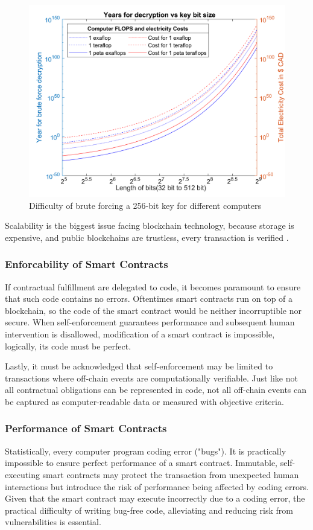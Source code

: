  	\begin{figure}[ht]
  	\centering 
  	\includegraphics[width=0.7\linewidth]{Diagrams/epicPic.png}
  	\caption{Difficulty of brute forcing a 256-bit key for different computers}
  	\label{security:fig2}
  	\end{figure}


Scalability is the biggest issue facing blockchain technology, because storage is expensive, and public blockchains are trustless, every transaction is verified \cite{ethScale:Online}. 

\subsubsection{Enforcability of Smart Contracts}



If contractual fulfillment are delegated to code, it becomes paramount to
ensure that such code contains no errors.  Oftentimes smart contracts run on top of a blockchain, so the code of the smart contract would be neither incorruptible nor secure. When self-enforcement guarantees performance and subsequent human intervention is disallowed, modification of a  smart contract is impossible, logically, its
code must be perfect. 

Lastly, it must be acknowledged that self-enforcement may be limited to transactions
where off-chain events are computationally verifiable. Just like not all contractual
obligations can be represented in code, not all off-chain events can be captured as
computer-readable data or measured with objective criteria. 

\subsubsection{Performance of Smart Contracts}
Statistically, every computer program coding error ("bugs"). It is practically impossible to ensure perfect performance of a smart contract. Immutable, self-executing smart contracts may protect  
the transaction from unexpected human interactions but introduce the risk of
performance being affected by coding errors. Given that the smart contract may execute incorrectly due to a coding error, the practical difficulty of writing bug-free code, alleviating and reducing risk from vulnerabilities is essential.


